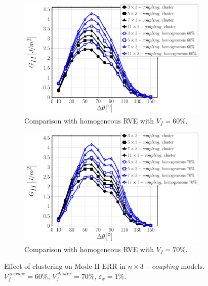 \documentclass[review]{elsarticle}
\begin{document}
\begin{figure}[!h]
\centering
    \begin{subfigure}[b]{0.475\textwidth}
        \includegraphics[width=\textwidth]{nx1-coupling-vf60-GII.pdf}
        \caption{Comparison with homogeneous RVE with $V_{f}=60\%$.}\label{subfig:clusterCouplingnx3ModeII60}
    \end{subfigure}\quad
    \begin{subfigure}[b]{0.475\textwidth}
        \includegraphics[width=\textwidth]{nx1-coupling-vf70-GII.pdf}
        \caption{Comparison with homogeneous RVE with $V_{f}=70\%$.}\label{subfig:clusterCouplingnx3ModeII70}
    \end{subfigure}

\caption{Effect of clustering on Mode II ERR in $n\times 3-coupling$ models. $V^{average}_{f}=60\%$, $V^{cluster}_{f}=70\%$, $\varepsilon_{x}=1\%$.}\label{fig:clusterCouplingnx3ModeII}
\end{figure}
\end{document}
